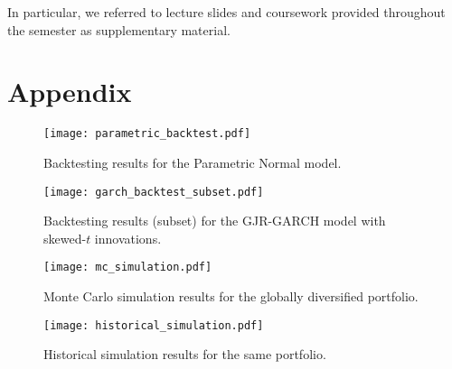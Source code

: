 \documentclass{article}
\begin{document}
In particular, we referred to lecture slides and coursework provided throughout the semester as supplementary material.


\section{Appendix}

\begin{figure}[H]
    \centering
    \begin{minipage}{0.95\textwidth}
        \centering
        \texttt{[image: parametric\_backtest.pdf]}
        \caption{Backtesting results for the Parametric Normal model.}
    \end{minipage}
\end{figure}

\begin{figure}[H]
    \centering
    \begin{minipage}{0.95\textwidth}
        \centering
        \texttt{[image: garch\_backtest\_subset.pdf]}
        \caption{Backtesting results (subset) for the GJR-GARCH model with skewed-$t$ innovations.}
    \end{minipage}
\end{figure}

\begin{figure}[H]
    \centering
    \begin{minipage}{0.95\textwidth}
        \centering
        \texttt{[image: mc\_simulation.pdf]}
        \caption{Monte Carlo simulation results for the globally diversified portfolio.}
    \end{minipage}
\end{figure}

\begin{figure}[H]
    \centering
    \begin{minipage}{0.95\textwidth}
        \centering
        \texttt{[image: historical\_simulation.pdf]}
        \caption{Historical simulation results for the same portfolio.}
    \end{minipage}
\end{figure}
\end{document}
